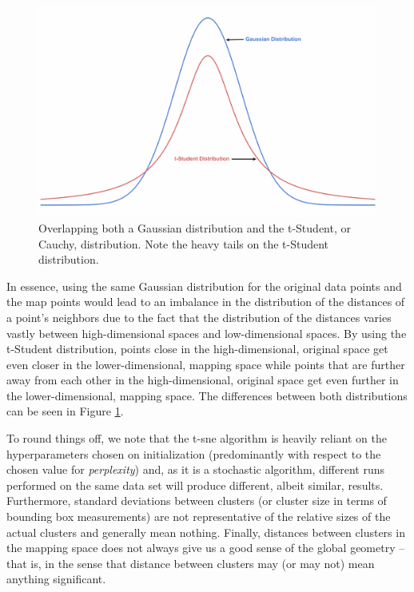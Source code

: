 \begin{figure}[H]
    \centering
    \includegraphics[width=\textwidth]{Images/Chapter 3/t-SNE/t-SNE-Illustration-1.pdf}
    \caption{Overlapping both a Gaussian distribution and the t-Student, or Cauchy, distribution. Note the heavy tails on the t-Student distribution.}
    \label{fig:t-SNE-Illustration}
\end{figure}

\noindent \newline In essence, using the same Gaussian distribution for the original data points and the map points would lead to an imbalance in the distribution of the distances of a point's neighbors due to the fact that the distribution of the distances varies vastly between high-dimensional spaces and low-dimensional spaces. By using the t-Student distribution, points close in the high-dimensional, original space get even closer in the lower-dimensional, mapping space while points that are further away from each other in the high-dimensional, original space get even further in the lower-dimensional, mapping space. The differences between both distributions can be seen in Figure \ref{fig:t-SNE-Illustration}.

\noindent \newline To round things off, we note that the \gls{t-sne} algorithm is heavily reliant on the hyperparameters chosen on initialization (predominantly with respect to the chosen value for \textit{perplexity}) and, as it is a stochastic algorithm, different runs performed on the same data set will produce different, albeit similar, results. Furthermore, standard deviations between clusters (or cluster size in terms of bounding box measurements) are not representative of the relative sizes of the actual clusters and generally mean nothing. Finally, distances between clusters in the mapping space does not always give us a good sense of the global geometry -- that is, in the sense that distance between clusters may (or may not) mean anything significant.

